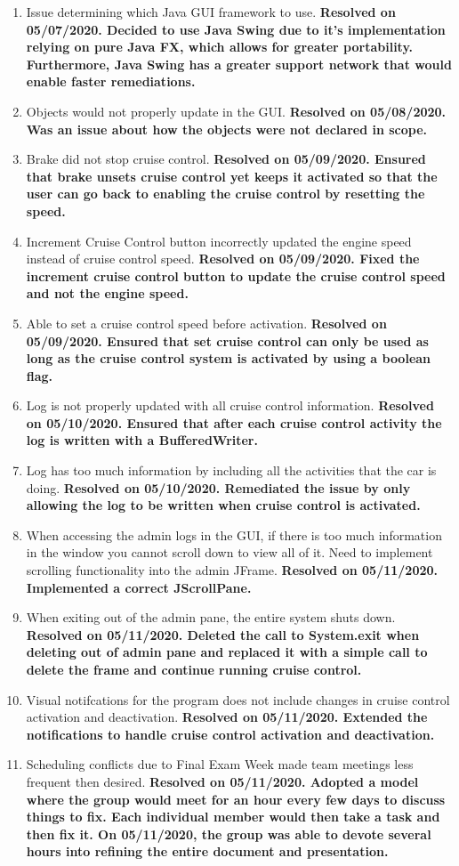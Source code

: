 \documentclass[preprint,11pt,3p]{article}
\begin{document}
\begin{enumerate} 
	\item Issue determining which Java GUI framework to use. \textbf{Resolved on 05/07/2020. Decided to use Java Swing due to it's implementation relying on pure Java FX, which allows for greater portability. Furthermore, Java Swing has a greater support network that would enable faster remediations.}
	\item Objects would not properly update in the GUI. \textbf{Resolved on 05/08/2020. Was an issue about how the objects were not declared in scope.}
	\item Brake did not stop cruise control. \textbf{Resolved on 05/09/2020. Ensured that brake unsets cruise control yet keeps it activated so that the user can go back to enabling the cruise control by resetting the speed.}
	\item Increment Cruise Control button incorrectly updated the engine speed instead of cruise control speed. \textbf{Resolved on 05/09/2020. Fixed the increment cruise control button to update the cruise control speed and not the engine speed.}
	\item Able to set a cruise control speed before activation. \textbf{Resolved on 05/09/2020. Ensured that set cruise control can only be used as long as the cruise control system is activated by using a boolean flag.}
	\item Log is not properly updated with all cruise control information. \textbf{Resolved on 05/10/2020. Ensured that after each cruise control activity the log is written with a BufferedWriter.}
	\item Log has too much information by including all the activities that the car is doing. \textbf{Resolved on 05/10/2020. Remediated the issue by only allowing the log to be written when cruise control is activated.}
	\item When accessing the admin logs in the GUI, if there is too much information in the window you cannot scroll down to view all of it. Need to implement scrolling functionality into the admin JFrame. \textbf{Resolved on 05/11/2020. Implemented a correct JScrollPane.} 
	\item When exiting out of the admin pane, the entire system shuts down. \textbf{Resolved on 05/11/2020. Deleted the call to System.exit when deleting out of admin pane and replaced it with a simple call to delete the frame and continue running cruise control.}
	\item Visual notifcations for the program does not include changes in cruise control activation and deactivation. \textbf{Resolved on 05/11/2020. Extended the notifications to handle cruise control activation and deactivation.}
	\item Scheduling conflicts due to Final Exam Week made team meetings less frequent then desired. \textbf{Resolved on 05/11/2020. Adopted a model where the group would meet for an hour every few days to discuss things to fix. Each individual member would then take a task and then fix it. On 05/11/2020, the group was able to devote several hours into refining the entire document and presentation.}



\end{enumerate}
\end{document}
